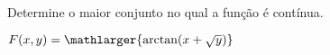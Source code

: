 
Determine o maior conjunto no qual a função é contínua.

\item $ F(x,y)=\mathlarger{\arctan (x+\sqrt{y})}$
